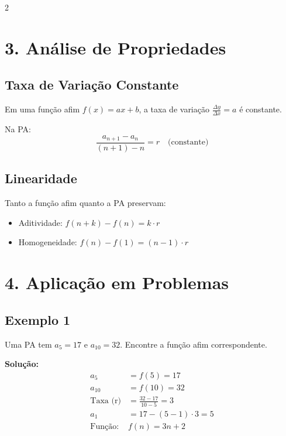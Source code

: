 \documentclass[11pt]{article}
\begin{document}
\begin{multicols}{2}
\begin{center}
\end{center}


\section*{3. Análise de Propriedades}
\subsection*{Taxa de Variação Constante}
Em uma função afim $f(x) = ax + b$, a taxa de variação $\frac{\Delta y}{\Delta x} = a$ é constante.

Na PA:
\[
\frac{a_{n+1} - a_n}{(n+1)-n} = r \quad \text{(constante)}
\]

\subsection*{Linearidade}
Tanto a função afim quanto a PA preservam:
\begin{itemize}
\item Aditividade: $f(n+k) - f(n) = k \cdot r$
\item Homogeneidade: $f(n) - f(1) = (n-1) \cdot r$
\end{itemize}

\section*{4. Aplicação em Problemas}
\subsection*{Exemplo 1}
Uma PA tem $a_5 = 17$ e $a_{10} = 32$. Encontre a função afim correspondente.

\textbf{Solução:}
\begin{align*}
a_5 &= f(5) = 17 \\
a_{10} &= f(10) = 32 \\
\text{Taxa (r)} &= \frac{32-17}{10-5} = 3 \\
a_1 &= 17 - (5-1)\cdot3 = 5 \\
\text{Função: } & f(n) = 3n + 2
\end{align*}


\end{multicols}
\end{document}
